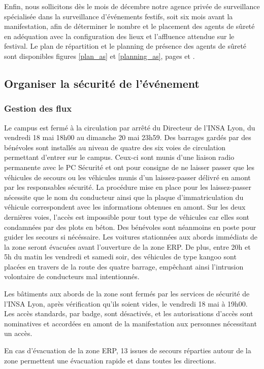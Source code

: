 \documentclass[hidelinks, paper=a4, fontsize=13pt]{report}
\begin{document}
Enfin, nous sollicitons dès le mois de décembre notre agence privée de surveillance spécialisée dans la surveillance d'événements festifs, soit six mois avant la manifestation, afin de déterminer le nombre et le placement des agents de sûreté en adéquation avec la configuration des lieux et l'affluence attendue sur le festival. Le plan de répartition et le planning de présence des agents de sûreté sont disponibles figures \ref{plan_as} et \ref{planning_as}, pages \pageref{plan_as} et \pageref{planning_as}.
 
\subsection{Organiser la sécurité de l'événement}

\subsubsection{Gestion des flux}
\label{gestion_flux}

\begin{list}{•}{}
	\item Le campus est fermé à la circulation par arrêté du Directeur de l'INSA Lyon, du vendredi 18 mai 18h00 au dimanche 20 mai 23h59. Des barrages gardés par des bénévoles sont installés au niveau de quatre des six voies de circulation permettant d'entrer sur le campus. Ceux-ci sont munis d'une liaison radio permanente avec le PC Sécurité et ont pour consigne de ne laisser passer que les véhicules de secours ou les véhicules munis d'un laissez-passer délivré en amont par les responsables sécurité. La procédure mise en place pour les laissez-passer nécessite que le nom du conducteur ainsi que la plaque d'immatriculation du véhicule correspondent avec les informations obtenues en amont. Sur les deux dernières voies, l'accès est impossible pour tout type de véhicules car elles sont condamnées par des plots en béton. Des bénévoles sont néanmoins en poste pour guider les secours si nécéssaire. Les voitures stationnées aux abords immédiats de la zone seront évacuées avant l'ouverture de la zone ERP. De plus, entre 20h et 5h du matin les vendredi et samedi soir, des véhicules de type kangoo sont placées en travers de la route des quatre barrage, empêchant ainsi l'intrusion volontaire de conducteurs mal intentionnés.
	\item Les bâtiments aux abords de la zone sont fermés par les services de sécurité de l'INSA Lyon, après vérification qu'ils soient vides, le vendredi 18 mai à 19h00. Les accès standards, par badge, sont désactivés, et les autorisations d'accès sont nominatives et accordées en amont de la manifestation aux personnes nécessitant un accès.
	\item En cas d'évacuation de la zone ERP, 13 issues de secours réparties autour de la zone permettent une évacuation rapide et dans toutes les directions.
\end{list}
 
\end{document}
